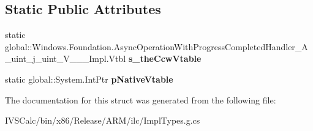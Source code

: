 \subsection*{Static Public Attributes}
\begin{DoxyCompactItemize}
\item 
\mbox{\label{struct_windows_1_1_foundation_1_1_async_operation_with_progress_completed_handler___a__uint__j__uint___v_______impl_1_1_vtbl_a49d586cd70dc4c6c98a774e120ed879a}} 
static global\+::\+Windows.\+Foundation.\+Async\+Operation\+With\+Progress\+Completed\+Handler\+\_\+\+A\+\_\+uint\+\_\+j\+\_\+uint\+\_\+\+V\+\_\+\+\_\+\+\_\+\+Impl.\+Vtbl {\bfseries s\+\_\+the\+Ccw\+Vtable}
\item 
\mbox{\label{struct_windows_1_1_foundation_1_1_async_operation_with_progress_completed_handler___a__uint__j__uint___v_______impl_1_1_vtbl_a3f00a316b3fef5e29b5fa3804a79cacc}} 
static global\+::\+System.\+Int\+Ptr {\bfseries p\+Native\+Vtable}
\end{DoxyCompactItemize}


The documentation for this struct was generated from the following file\+:\begin{DoxyCompactItemize}
\item 
I\+V\+S\+Calc/bin/x86/\+Release/\+A\+R\+M/ilc/Impl\+Types.\+g.\+cs\end{DoxyCompactItemize}
